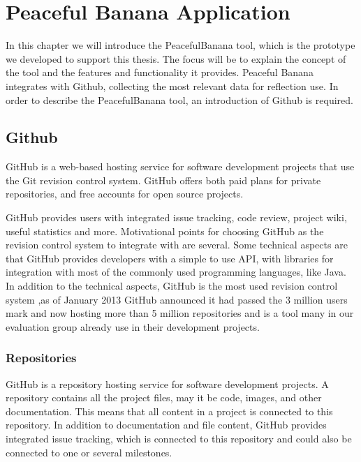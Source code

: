 \chapter{Peaceful Banana Application}
\label{peacefulBananaApplication}
In this chapter we will introduce the PeacefulBanana tool, which is the prototype we developed to support this thesis. The focus will be to explain the concept of the tool and the features and functionality it provides. 
Peaceful Banana integrates with Github, collecting the most relevant data for reflection use. In order to describe the PeacefulBanana tool, an introduction of Github is required.\\

\section{Github}
\label{githubchapter}
GitHub is a web-based hosting service for software development projects that use the Git revision control system\cite{git,github}. GitHub offers both paid plans for private repositories, and free accounts for open source projects.

GitHub provides users with integrated issue tracking, code review, project wiki, useful statistics and more. 
Motivational points for choosing GitHub as the revision control system to integrate with are several. Some technical aspects are that GitHub provides developers with a simple to use API\cite{githubapi}, with libraries for integration with most of the commonly used programming languages, like Java\cite{jgit}.\\
In addition to the technical aspects, GitHub is the most used revision control system ,as of January 2013 GitHub announced it had passed the 3 million users mark and now hosting more than 5 million repositories and is a tool many in our evaluation group already use in their development projects\cite{githubnumbers}.

\subsection{Repositories}
GitHub is a repository hosting service for software development projects. A repository contains all the project files, may it be code, images, and other documentation. This means that all content in a project is connected to this repository. In addition to documentation and file content, GitHub provides integrated issue tracking, which is connected to this repository and could also be connected to one or several milestones. 
